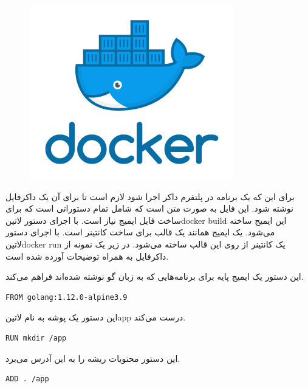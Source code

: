 \documentclass[a4]{report}
\begin{document}
\begin{figure}
\centering
\includegraphics[scale=0.25]{fig/docker}
\end{figure}

برای این که یک برنامه در پلتفرم داکر اجرا شود لازم است تا برای آن یک داکرفایل
نوشته شود. این فایل به صورت متن است که شامل تمام دستوراتی است که برای ساخت فایل ایمیج نیاز است. با اجرای دستور ‌لاتین{docker build} این ایمیج ساخته می‌شود. یک ایمیج همانند یک قالب برای ساخت کانتینر است. با اجرای دستور ‌لاتین{docker run} یک کانتینر از روی این قالب ساخته می‌شود.
در زیر یک نمونه از داکرفایل به همراه توضیحات آورده شده است.


این دستور یک ایمیج پایه برای برنامه‌هایی که به زبان گو نوشته شده‌اند فراهم می‌کند.

\begin{latin}
\begin{verbatim}
FROM golang:1.12.0-alpine3.9
\end{verbatim}
\end{latin}

این دستور یک پوشه به نام ‌لاتین{app} درست می‌کند.

\begin{latin}
\begin{verbatim}
RUN mkdir /app
\end{verbatim}
\end{latin}

این دستور محتویات ریشه را به این آدرس می‌برد.

\begin{latin}
\begin{verbatim}
ADD . /app
\end{verbatim}
\end{latin}
\end{document}
